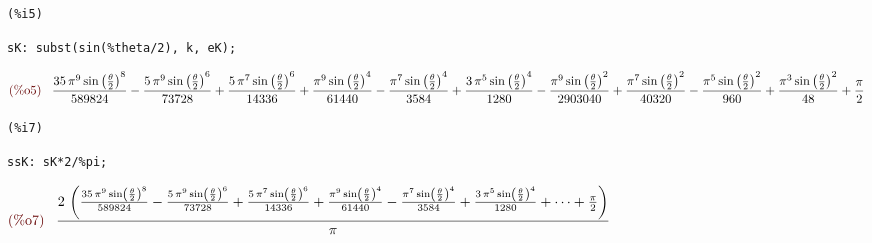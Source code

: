 \documentclass[12pt]{article}
\begin{document}
\noindent
\begin{minipage}[t]{8ex}{\color{red}\bf
\begin{verbatim}
(%i5) 
\end{verbatim}}
\end{minipage}
\begin{minipage}[t]{\textwidth}{\color{blue}
\begin{verbatim}
sK: subst(sin(%theta/2), k, eK);
\end{verbatim}}
\end{minipage}
\begin{math}\displaystyle
\parbox{8ex}{\color{labelcolor}(\%o5) }
\frac{35\,{\pi }^{9}\,{\mathrm{sin}\left( \frac{\theta}{2}\right) }^{8}}{589824}-\frac{5\,{\pi }^{9}\,{\mathrm{sin}\left( \frac{\theta}{2}\right) }^{6}}{73728}+\frac{5\,{\pi }^{7}\,{\mathrm{sin}\left( \frac{\theta}{2}\right) }^{6}}{14336}+\frac{{\pi }^{9}\,{\mathrm{sin}\left( \frac{\theta}{2}\right) }^{4}}{61440}-\frac{{\pi }^{7}\,{\mathrm{sin}\left( \frac{\theta}{2}\right) }^{4}}{3584}+\frac{3\,{\pi }^{5}\,{\mathrm{sin}\left( \frac{\theta}{2}\right) }^{4}}{1280}-\frac{{\pi }^{9}\,{\mathrm{sin}\left( \frac{\theta}{2}\right) }^{2}}{2903040}+\frac{{\pi }^{7}\,{\mathrm{sin}\left( \frac{\theta}{2}\right) }^{2}}{40320}-\frac{{\pi }^{5}\,{\mathrm{sin}\left( \frac{\theta}{2}\right) }^{2}}{960}+\frac{{\pi }^{3}\,{\mathrm{sin}\left( \frac{\theta}{2}\right) }^{2}}{48}+\frac{\pi }{2}
\end{math}

\noindent
\begin{minipage}[t]{8ex}{\color{red}\bf
\begin{verbatim}
(%i7) 
\end{verbatim}}
\end{minipage}
\begin{minipage}[t]{\textwidth}{\color{blue}
\begin{verbatim}
ssK: sK*2/%pi;
\end{verbatim}}
\end{minipage}
\begin{math}\displaystyle
\parbox{8ex}{\color{labelcolor}(\%o7) }
\frac{2\,\left( \frac{35\,{\pi }^{9}\,{\mathrm{sin}\left( \frac{\theta}{2}\right) }^{8}}{589824}-\frac{5\,{\pi }^{9}\,{\mathrm{sin}\left( \frac{\theta}{2}\right) }^{6}}{73728}+\frac{5\,{\pi }^{7}\,{\mathrm{sin}\left( \frac{\theta}{2}\right) }^{6}}{14336}+\frac{{\pi }^{9}\,{\mathrm{sin}\left( \frac{\theta}{2}\right) }^{4}}{61440}-\frac{{\pi }^{7}\,{\mathrm{sin}\left( \frac{\theta}{2}\right) }^{4}}{3584}+\frac{3\,{\pi }^{5}\,{\mathrm{sin}\left( \frac{\theta}{2}\right) }^{4}}{1280}+\cdots+\frac{\pi }{2}\right) }{\pi }
\end{math}
\end{document}
